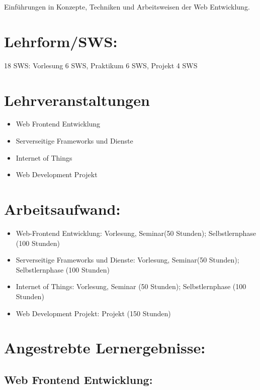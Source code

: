 Einführungen in Konzepte, Techniken und Arbeitsweisen der Web
Entwicklung.

\section*{Lehrform/SWS:}\label{lehrformsws-26}

18 SWS: Vorlesung 6 SWS, Praktikum 6 SWS, Projekt 4 SWS

\section*{Lehrveranstaltungen}\label{lehrveranstaltungen-1}

\begin{itemize}
\item
  Web Frontend Entwicklung
\item
  Serverseitige Frameworks und Dienste
\item
  Internet of Things
\item
  Web Development Projekt
\end{itemize}

\section*{Arbeitsaufwand:}\label{arbeitsaufwand-22}

\begin{itemize}
\item
  Web-Frontend Entwicklung: Vorlesung, Seminar(50 Stunden);
  Selbstlernphase (100 Stunden)
\item
  Serverseitige Frameworks und Dienste: Vorlesung, Seminar(50 Stunden);
  Selbstlernphase (100 Stunden)
\item
  Internet of Things: Vorlesung, Seminar (50 Stunden); Selbstlernphase
  (100 Stunden)
\item
  Web Development Projekt: Projekt (150 Stunden)
\end{itemize}

\section*{Angestrebte
Lernergebnisse:}\label{angestrebte-lernergebnisse-30}

\subsection*{Web Frontend
Entwicklung:}\label{web-frontend-entwicklung}

